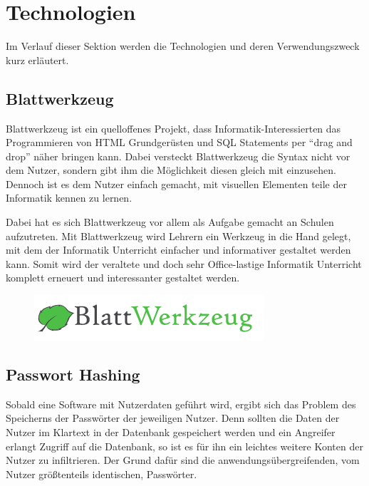 \section{Technologien}
\label{sec:technology}
Im Verlauf dieser Sektion werden die Technologien und deren Verwendungszweck
kurz erläutert.

\subsection{Blattwerkzeug}
\label{sec:blattwerkzeug}
Blattwerkzeug ist ein quelloffenes Projekt, dass Informatik-Interessierten das Programmieren von \gls{HTML} Grundgerüsten und SQL Statements per \enquote{drag and drop} näher bringen kann. Dabei versteckt Blattwerkzeug die Syntax nicht vor dem Nutzer, sondern gibt ihm die Möglichkeit diesen gleich mit einzusehen. Dennoch ist es dem Nutzer einfach gemacht, mit visuellen Elementen teile der Informatik kennen zu lernen.

Dabei hat es sich Blattwerkzeug vor allem als Aufgabe gemacht an Schulen aufzutreten. Mit Blattwerkzeug wird Lehrern ein Werkzeug in die Hand gelegt, mit dem der Informatik Unterricht einfacher und informativer gestaltet werden kann. Somit wird der veraltete und doch sehr Office-lastige Informatik Unterricht komplett erneuert und interessanter gestaltet werden.

\begin{figure}[h]
	\includegraphics[scale=0.6]{graphics/blattwerkzeug.png}
\end{figure}

\subsection{Passwort Hashing}
\label{sec:password_hashing}

Sobald eine Software mit Nutzerdaten geführt wird, ergibt sich das Problem des Speicherns der Passwörter der jeweiligen Nutzer.
Denn sollten die Daten der Nutzer im Klartext in der Datenbank gespeichert werden und ein Angreifer erlangt Zugriff auf die Datenbank, so ist es für ihn ein leichtes weitere Konten der Nutzer zu infiltrieren. Der Grund dafür sind die anwendungsübergreifenden, vom Nutzer grö{\ss}tenteils identischen, Passwörter.

